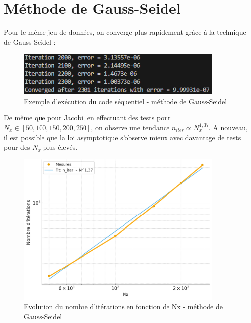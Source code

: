 \documentclass{article}
\begin{document}
\section{Méthode de Gauss-Seidel}
Pour le même jeu de données, on converge plus rapidement grâce à la technique de Gauss-Seidel :

\begin{figure}[H]
    \centering
    \includegraphics[width=0.9\textwidth]{test_gaussseidel_seq.png}
    \caption{Exemple d'exécution du code séquentiel - méthode de Gauss-Seidel}
    \label{fig:GSseq}
\end{figure}

De même que pour Jacobi, en effectuant des tests  pour $N_x \in [50,100,150,200,250]$, on observe une tendance $n_{iter} \propto N_x^{1,37}$. A nouveau, il est possible que la loi asymptotique s'observe mieux avec davantage de tests pour des $N_x$ plus élevés.

\begin{figure}[H]
    \centering
    \includegraphics[width=0.9\textwidth]{courbe_log_log_gs.png}
    \caption{Evolution du nombre d'itérations en fonction de Nx - méthode de Gauss-Seidel}
    \label{fig:loglogGS}
\end{figure}
\end{document}
